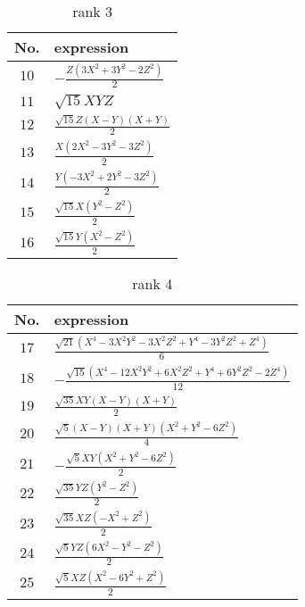 \documentclass[fleqn,8pt,landscape]{jsarticle}
\begin{document}
\begin{table}[ht!]
\begin{center}
\caption{rank 3}
\renewcommand{\arraystretch}{1.3}
\begin{tabular}{cl} \hline \hline
No. & expression \\ \hline
$ 10 $ & $ - \frac{Z \left(3 X^{2} + 3 Y^{2} - 2 Z^{2}\right)}{2} $ \\
$ 11 $ & $ \sqrt{15} X Y Z $ \\
$ 12 $ & $ \frac{\sqrt{15} Z \left(X - Y\right) \left(X + Y\right)}{2} $ \\
$ 13 $ & $ \frac{X \left(2 X^{2} - 3 Y^{2} - 3 Z^{2}\right)}{2} $ \\
$ 14 $ & $ \frac{Y \left(- 3 X^{2} + 2 Y^{2} - 3 Z^{2}\right)}{2} $ \\
$ 15 $ & $ \frac{\sqrt{15} X \left(Y^{2} - Z^{2}\right)}{2} $ \\
$ 16 $ & $ \frac{\sqrt{15} Y \left(X^{2} - Z^{2}\right)}{2} $ \\
 \hline \hline
\end{tabular}
\end{center}
\end{table}
\begin{table}[ht!]
\begin{center}
\caption{rank 4}
\renewcommand{\arraystretch}{1.3}
\begin{tabular}{cl} \hline \hline
No. & expression \\ \hline
$ 17 $ & $ \frac{\sqrt{21} \left(X^{4} - 3 X^{2} Y^{2} - 3 X^{2} Z^{2} + Y^{4} - 3 Y^{2} Z^{2} + Z^{4}\right)}{6} $ \\
$ 18 $ & $ - \frac{\sqrt{15} \left(X^{4} - 12 X^{2} Y^{2} + 6 X^{2} Z^{2} + Y^{4} + 6 Y^{2} Z^{2} - 2 Z^{4}\right)}{12} $ \\
$ 19 $ & $ \frac{\sqrt{35} X Y \left(X - Y\right) \left(X + Y\right)}{2} $ \\
$ 20 $ & $ \frac{\sqrt{5} \left(X - Y\right) \left(X + Y\right) \left(X^{2} + Y^{2} - 6 Z^{2}\right)}{4} $ \\
$ 21 $ & $ - \frac{\sqrt{5} X Y \left(X^{2} + Y^{2} - 6 Z^{2}\right)}{2} $ \\
$ 22 $ & $ \frac{\sqrt{35} Y Z \left(Y^{2} - Z^{2}\right)}{2} $ \\
$ 23 $ & $ \frac{\sqrt{35} X Z \left(- X^{2} + Z^{2}\right)}{2} $ \\
$ 24 $ & $ \frac{\sqrt{5} Y Z \left(6 X^{2} - Y^{2} - Z^{2}\right)}{2} $ \\
$ 25 $ & $ \frac{\sqrt{5} X Z \left(X^{2} - 6 Y^{2} + Z^{2}\right)}{2} $ \\
 \hline \hline
\end{tabular}
\end{center}
\end{table}
\end{document}
